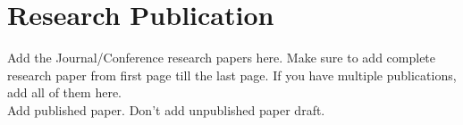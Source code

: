 \chapter{Research Publication}

Add the Journal/Conference research papers here. Make sure to add complete research paper from first page till the last page. If you have multiple publications, add all of them here. \\
Add published paper. Don't add unpublished paper draft.